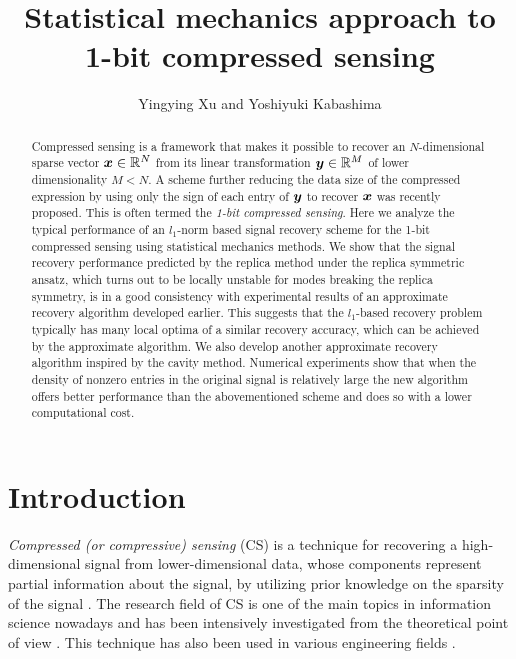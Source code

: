 \documentclass[12pt]{iopart}
\begin{document}
\title{Statistical mechanics approach to 1-bit compressed sensing}
\author{Yingying Xu and Yoshiyuki Kabashima }

\address{Department of Computational Intelligence and Systems Science, 
\\Tokyo Institute of Technology, Yokohama 226-8502, Japan}

\begin{abstract}
Compressed sensing is a framework that makes it possible to recover an $N$-dimensional sparse vector $\textrm{\boldmath $x$}\in \mathbb{R}^N$ from its linear transformation $\textrm{\boldmath $y$}\in \mathbb{R}^M$ of lower dimensionality $M < N$. A scheme further reducing the data size of the compressed expression by using only the sign of each entry of $\textrm{\boldmath $y$}$ to recover $\textrm{\boldmath $x$}$ was recently proposed. This is often termed the {\em 1-bit compressed sensing}. Here we analyze the typical performance of an $l_1$-norm based signal recovery scheme for the 1-bit compressed sensing using statistical mechanics methods. We show that the signal recovery performance predicted by the replica method under the replica symmetric ansatz, which turns out to be locally unstable for modes breaking the replica symmetry, is in a good consistency with experimental results of an approximate recovery algorithm developed earlier. This suggests that the $l_1$-based recovery problem typically has many local optima of a similar recovery accuracy, which can be achieved by the approximate algorithm. We also develop another approximate recovery algorithm inspired by the cavity method. Numerical experiments show that when the density of nonzero entries in the original signal is relatively large the new algorithm offers better performance than the abovementioned scheme and does so with a lower computational cost. 
\end{abstract}

\maketitle

\section{Introduction}
\textit{Compressed (or compressive) sensing} (CS) is a technique for recovering a high-dimensional signal from lower-dimensional data, whose components represent partial information about the signal, by utilizing prior knowledge on the sparsity of the signal \cite{CandesWakin2008}. The research field of CS is one of the main topics in information science nowadays and has been intensively investigated from the theoretical point of view \cite{Donoho2006, CandesRombergTao2006,KWT2009,Sompolinsky2010,Krzakala2012}. This technique has also been used in various engineering fields \cite{CShardware}.
\end{document}
